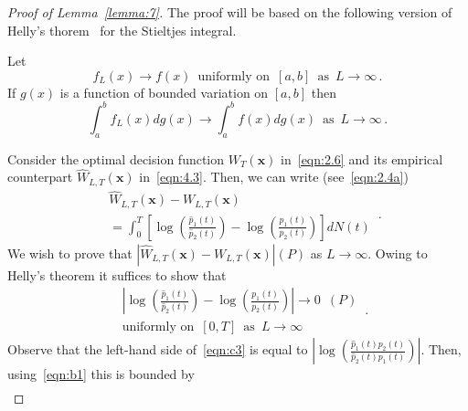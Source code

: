 \documentclass[lettersize,journal,onecolumn]{IEEEtran}
\theoremstyle{definition}
\begin{document}
\begin{proof}[Proof of Lemma~\ref{lemma:7}]
	The proof will be based on the following version of Helly's 
	thorem~\cite{apostol1974mathematical} for the Stieltjes integral. 
	\begin{quoting}
		Let
		\begin{equation*}
			f_{L}(x) \to f(x)
			\enspace \text{uniformly on}
			\enspace [a,b]
			\enspace \text{as}
			\enspace L\to\infty
			\,.
		\end{equation*}
		If $g(x)$ is a function of bounded variation on $[a,b]$ then
		\begin{equation}
			\int_{a}^{b}f_{L}(x)dg(x) \to
			\int_{a}^{b}f(x)dg(x)
			\enspace \text{as}
			\enspace L\to\infty
			\label{eqn:c1}\,.
		\end{equation}
	\end{quoting}
	Consider the optimal decision function $W_{T}(\mathbf{x})$ in~\eqref{eqn:2.6} and 
	its empirical counterpart $\widehat{W}_{L,T}(\mathbf{x})$ in~\eqref{eqn:4.3}. Then, 
	we can write (see~\eqref{eqn:2.4a})
	\begin{equation}
		\begin{split}
			& \widehat{W}_{L,T}(\mathbf{x}) - W_{L,T}(\mathbf{x}) \\
			& = 
			\int_{0}^{T}\left[
			\log\left(\frac{\widehat{p}_{1}(t)}{\widehat{p}_{2}(t)}\right) - 
			\log\left(\frac{p_{1}(t)}{p_{2}(t)}\right)
			\right] dN(t)
		\end{split}
		\label{eqn:c2}\,.
	\end{equation}
	We wish to prove that \mbox{$
		\left|\widehat{W}_{L,T}(\mathbf{x}) - W_{L,T}(\mathbf{x})\right|
		$}\enspace$(P)$ as $L\to\infty$. Owing to Helly's theorem it suffices to show that
	\begin{equation}
		\begin{split}
			& \left|
			\log\left(\frac{\widehat{p}_{1}(t)}{\widehat{p}_{2}(t)}\right) - 
			\log\left(\frac{p_{1}(t)}{p_{2}(t)}\right)
			\right| \to 0
			\enspace (P) \\
			& \text{uniformly on}
			\enspace [0,T]
			\enspace \text{as}
			\enspace L\to\infty
		\end{split}
		\label{eqn:c3}\,.		
	\end{equation}
	Observe that the left-hand side of~\eqref{eqn:c3} is equal to \mbox{$
		\left|
		\log\left(
		\frac{\widehat{p}_{1}(t)p_{2}(t)}{\widehat{p}_{2}(t)p_{1}(t)}
		\right)
		\right|
		$}. Then, using~\eqref{eqn:b1} this is bounded by
	\begin{equation*}
		\begin{split}

\end{split}
\end{equation*}
\end{proof}
\end{document}
